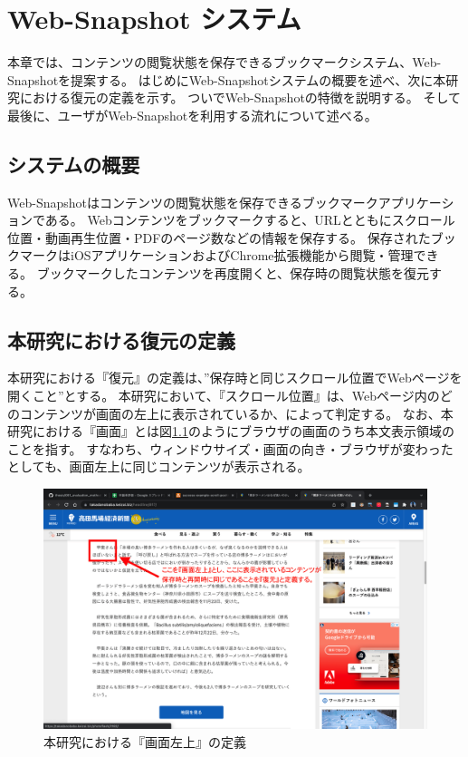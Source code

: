 \chapter{Web-Snapshot システム}
\label{chap:web_snapshot_system}
本章では、コンテンツの閲覧状態を保存できるブックマークシステム、Web-Snapshotを提案する。
はじめにWeb-Snapshotシステムの概要を述べ、次に本研究における復元の定義を示す。
ついでWeb-Snapshotの特徴を説明する。
そして最後に、ユーザがWeb-Snapshotを利用する流れについて述べる。

\section{システムの概要}
Web-Snapshotはコンテンツの閲覧状態を保存できるブックマークアプリケーションである。
Webコンテンツをブックマークすると、URLとともにスクロール位置・動画再生位置・PDFのページ数などの情報を保存する。
保存されたブックマークはiOSアプリケーションおよびChrome拡張機能から閲覧・管理できる。
ブックマークしたコンテンツを再度開くと、保存時の閲覧状態を復元する。

\section{本研究における復元の定義}
\label{chap:web-snapshot-system-restore-definition}
本研究における『復元』の定義は、”保存時と同じスクロール位置でWebページを開くこと”とする。
本研究において、『スクロール位置』は、Webページ内のどのコンテンツが画面の左上に表示されているか、によって判定する。
なお、本研究における『画面』とは図\ref{fig:web-snapshot-system-definition-description-scroll-position}のようにブラウザの画面のうち本文表示領域のことを指す。
すなわち、ウィンドウサイズ・画面の向き・ブラウザが変わったとしても、画面左上に同じコンテンツが表示される。

\begin{figure}[htbp]
  \label{fig:web-snapshot-system-definition-description-scroll-position}
  \begin{center}
    \includegraphics[bb=0 0 1440 900,width=15cm]{img/030_web_snapshot_system/description-scroll-position-definition.pdf}
  \end{center}
  \caption{本研究における『画面左上』の定義}
\end{figure}


